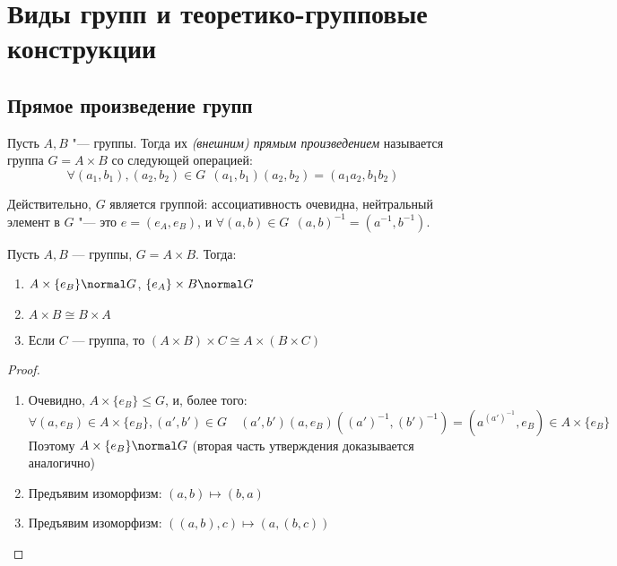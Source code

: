 \section{Виды групп и теоретико-групповые конструкции}

\subsection{Прямое произведение групп}

\begin{definition}
	Пусть $A, B$ "--- группы. Тогда их \textit{(внешним) прямым произведением} называется группа $G = A \times B$ со следующей операцией: 
	\[
		\forall (a_1, b_1), (a_2, b_2) \in G\ \ (a_1, b_1)(a_2, b_2) = (a_1a_2, b_1b_2)
	\]
\end{definition}

\begin{note}
	Действительно, $G$ является группой: ассоциативность очевидна, нейтральный элемент в $G$ "--- это $e = (e_A, e_B)$, и $\forall (a, b) \in G\ \ (a, b)^{-1} = (a^{-1}, b^{-1})$.
\end{note}

\begin{proposition}
	Пусть $A, B$ --- группы, $G = A\times B$. Тогда:
	\begin{enumerate}
		\item $A \times \{e_B\} \normal G$, $\{e_A\} \times B \normal G$
		
		\item $A \times B \cong B \times A$
		
		\item Если $C$ --- группа, то $(A \times B) \times C \cong A \times (B \times C)$
	\end{enumerate}
\end{proposition}

\begin{proof}~
	\begin{enumerate}
		\item Очевидно, $A \times \{e_B\} \le G$, и, более того:
		\[
			\forall (a, e_B) \in A \times \{e_B\}, (a', b') \in G \quad (a', b')(a, e_B)((a')^{-1}, (b')^{-1}) = (a^{(a')^{-1}}, e_B) \in A \times \{e_B\}
		\]
		Поэтому $A \times \{e_B\} \normal G$ (вторая часть утверждения доказывается аналогично)
		\item Предъявим изоморфизм: $(a, b) \mapsto (b, a)$
		\item Предъявим изоморфизм: $((a, b), c) \mapsto (a, (b, c))$
	\end{enumerate}
\end{proof}

